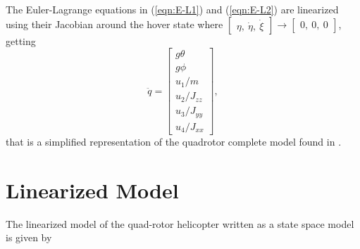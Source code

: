 The Euler-Lagrange equations in (\ref{eqn:E-L1}) and (\ref{eqn:E-L2}) are linearized using their Jacobian around the hover state where $\begin{bmatrix}
\eta,\ \dot{\eta},\ \dot{\xi}
\end{bmatrix} \to \begin{bmatrix}
0,\ 0,\ 0
\end{bmatrix}$, getting
\begin{equation}
\label{eqn:linear}
\ddot{q}
=
\begin{bmatrix}
g\theta \\
g\phi\\
u_{1}/m \\
u_{2}/J_{zz} \\
u_{3}/J_{yy} \\
u_{4}/J_{xx}
\end{bmatrix},
\end{equation}
that is a simplified representation of the quadrotor complete model found in \cite{Bouabdallah2007}.



\section{Linearized Model}
\setcounter{MaxMatrixCols}{20}

The linearized model of the quad-rotor helicopter written as a state space model is given by

